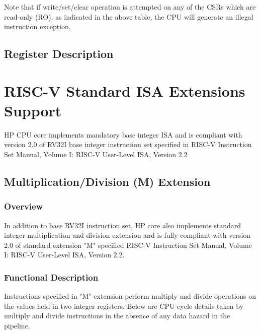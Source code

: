 \documentclass[main\_\_EN.tex]{subfiles}
\begin{document}

Note that if write/set/clear operation is attempted on any of the CSRs which are read-only (RO), as indicated in the above table, the CPU will generate an illegal instruction exception.

\subsection{Register Description}













\newpage
\section{RISC-V Standard ISA Extensions Support}


HP CPU core implements mandatory base integer ISA and is compliant with version 2.0 of RV32I base integer instruction set specified in RISC-V Instruction Set Manual, Volume I: RISC-V User-Level ISA, Version 2.2

\subsection{Multiplication/Division (M) Extension}
\label{sec:riscvcpu-mext}
\subsubsection{Overview}
\label{sec:riscvcpu-mext-overview}
In addition to base RV32I instruction set, HP core also implements standard integer multiplication and division extension and is fully compliant with version 2.0 of standard extension "M" specified RISC-V Instruction Set Manual, Volume I: RISC-V User-Level ISA, Version 2.2.

\subsubsection{Functional Description}
\label{sec:riscvcpu-mext-func-descr}

Instructions specified in "M" extension perform multiply and divide operations on the values held in two integer registers. Below are CPU cycle details taken by multiply and divide instructions in the absence of any data hazard in the pipeline.
\end{document}
